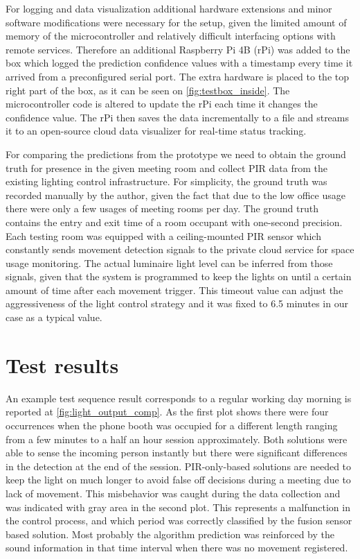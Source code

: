 For logging and data visualization additional hardware extensions and minor software modifications were necessary for the setup, given the limited amount of memory of the microcontroller and relatively difficult interfacing options with remote services. Therefore an additional Raspberry Pi 4B (rPi) was added to the box which logged the prediction confidence values with a timestamp every time it arrived from a preconfigured serial port. The extra hardware is placed to the top right part of the box, as it can be seen on \autoref{fig:testbox_inside}. The microcontroller code is altered to update the rPi each time it changes the confidence value. The rPi then saves the data incrementally to a file and streams it to an open-source cloud data visualizer for real-time status tracking.

For comparing the predictions from the prototype we need to obtain the ground truth for presence in the given meeting room and collect PIR data from the existing lighting control infrastructure. For simplicity, the ground truth was recorded manually by the author, given the fact that due to the low office usage there were only a few usages of meeting rooms per day. The ground truth contains the entry and exit time of a room occupant with one-second precision. Each testing room was equipped with a ceiling-mounted PIR sensor which constantly sends movement detection signals to the private cloud service for space usage monitoring. The actual luminaire light level can be inferred from those signals, given that the system is programmed to keep the lights on until a certain amount of time after each movement trigger. This timeout value can adjust the aggressiveness of the light control strategy and it was fixed to 6.5 minutes in our case as a typical value.


\section{Test results}

An example test sequence result corresponds to a regular working day morning is reported at \autoref{fig:light_output_comp}. As the first plot shows there were four occurrences when the phone booth was occupied for a different length ranging from a few minutes to a half an hour session approximately. Both solutions were able to sense the incoming person instantly but there were significant differences in the detection at the end of the session. PIR-only-based solutions are needed to keep the light on much longer to avoid false off decisions during a meeting due to lack of movement. This misbehavior was caught during the data collection and was indicated with gray area in the second plot. This represents a malfunction in the control process, and which period was correctly classified by the fusion sensor based solution. Most probably the algorithm prediction was reinforced by the sound information in that time interval when there was no movement registered.

